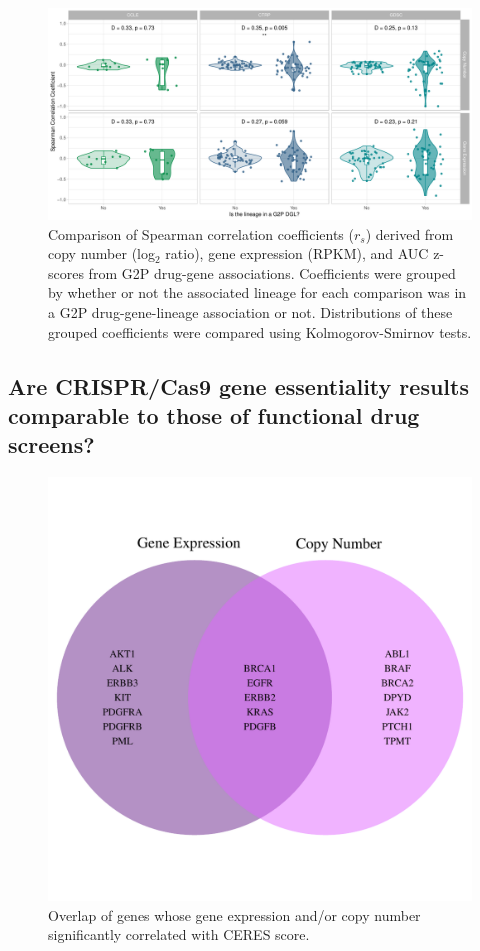 \documentclass[man,floatsintext]{apa6}
\begin{document}
\begin{figure}
\centering
\includegraphics{./plots/manuscript/g2p_spearman_ks_res_plot.pdf}
\caption{\label{fig:ksplot}Comparison of Spearman correlation coefficients (\(r_s\))
derived from copy number (log\(_2\) ratio), gene expression (RPKM), and
AUC z-scores from G2P drug-gene associations. Coefficients were grouped
by whether or not the associated lineage for each comparison was in a
G2P drug-gene-lineage association or not. Distributions of these grouped
coefficients were compared using Kolmogorov-Smirnov tests.}
\end{figure}

\subsection{Are CRISPR/Cas9 gene essentiality results comparable to
those of functional drug
screens?}\label{are-crisprcas9-gene-essentiality-results-comparable-to-those-of-functional-drug-screens}




\begin{figure}
\centering
\includegraphics{./plots/manuscript/crispr_venn.pdf}
\caption{\label{fig:crispr-venn}Overlap of genes whose gene expression and/or copy
number significantly correlated with CERES score.}
\end{figure}
\end{document}
